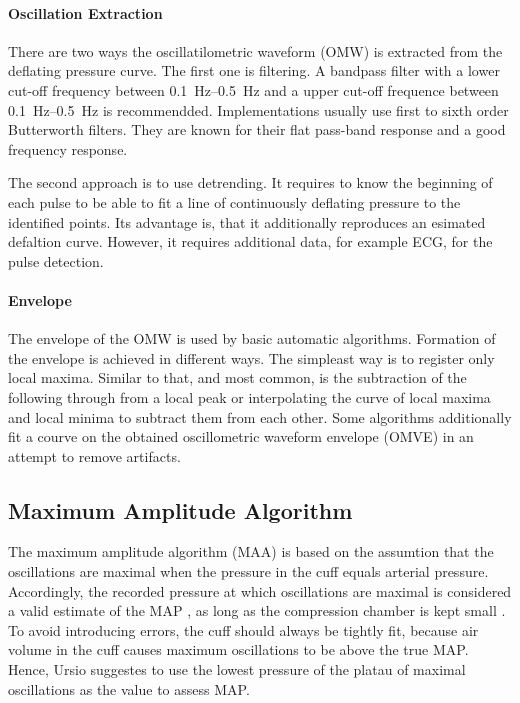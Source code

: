 \paragraph{Oscillation Extraction} There are two ways the oscillatilometric waveform (OMW) is extracted from the deflating pressure curve. The first one is filtering. A  bandpass filter with a lower cut-off frequency between \SIrange{0.1}{0.5}{\Hz} and a upper cut-off frequence between \SIrange{0.1}{0.5}{\Hz} is recommendded. \cite{Forouzanfar2015} Implementations usually use first \cite{Lim2015} to sixth order \cite{Jazbinsek2010} Butterworth filters. They are known for their flat pass-band response and a good frequency response. 

The second approach is to use detrending. It requires to know the beginning of each pulse to be able to fit a line of continuously deflating pressure to the identified points. Its advantage is, that it additionally reproduces an esimated defaltion curve. However, it requires additional data, for example ECG, for the pulse detection.\cite{Forouzanfar2015}

\paragraph{Envelope} The envelope of the OMW is used by basic automatic algorithms. Formation of the envelope is achieved in different ways. The simpleast way is to register only local maxima. Similar to that, and most common, is the subtraction of the following through from a local peak or interpolating the curve of local maxima and local minima to subtract them from each other. Some algorithms additionally fit a courve on the obtained oscillometric waveform envelope (OMVE) in an attempt to remove artifacts. \cite{Forouzanfar2014}


\subsection{Maximum Amplitude Algorithm}
The maximum amplitude algorithm (MAA) is based on the assumtion that the oscillations are maximal when the pressure in the cuff equals arterial pressure. Accordingly, the recorded pressure at which oscillations are maximal is considered a valid estimate of the MAP \cite{Babbs2012,Geddes1982,Drzewiecki1994}\cite{Ramsey1979}, as long as the compression chamber is kept small \cite{Mauck1980}. To avoid introducing errors, the cuff should always be tightly fit, because air volume in the cuff causes maximum oscillations to be above the true MAP. Hence, Ursio suggestes to use the lowest pressure of the platau of maximal oscillations as the value to assess MAP.\cite{Ursino1996}

